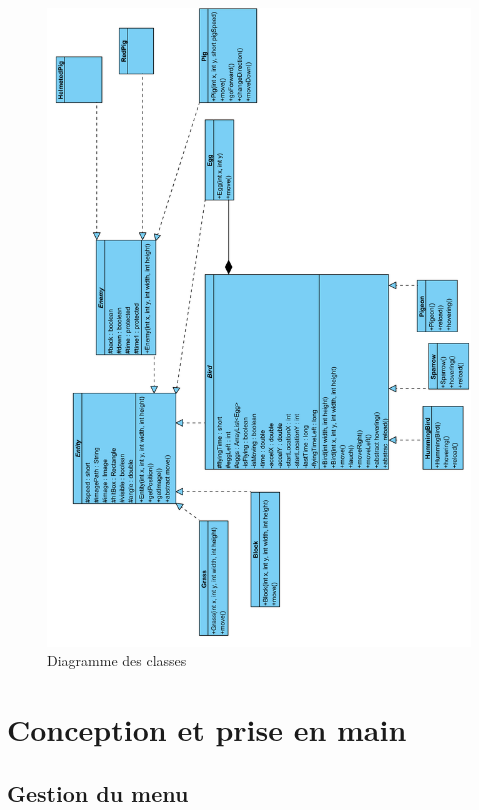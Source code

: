 \documentclass[a4paper,12pt]{report}
\begin{document}
\begin{figure}[H]
\begin{center}
\includegraphics[scale=0.27]{images/diagrammeclasses02.png} 
\end{center}
\caption{Diagramme des classes}
\label{Diagramme des classes}
\end{figure}

\chapter{Conception et prise en main}

\section{Gestion du menu}
\end{document}

